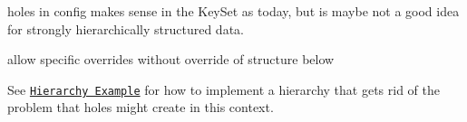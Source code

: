 holes in config makes sense in the Key\+Set as today, but is maybe not a good idea for strongly hierarchically structured data.


\begin{DoxyItemize}
\item allow specific overrides without override of structure below
\end{DoxyItemize}

See \href{/home/markus/Projekte/Elektra/current/src/bindings/cpp/examples/cpp_example_hierarchy.cpp}{\tt Hierarchy Example} for how to implement a hierarchy that gets rid of the problem that holes might create in this context. 